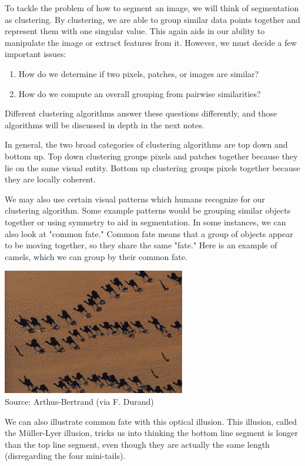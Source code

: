 \documentclass{article}
\begin{document}
To tackle the problem of how to segment an image, we will think of segmentation as clustering. By clustering, we are able to group similar data points together and represent them with one singular value. This again aids in our ability to manipulate the image or extract features from it. However, we must decide a few important issues:
\begin{enumerate}
\item How do we determine if two pixels, patches, or images are similar?
\item How do we compute an overall grouping from	
pairwise similarities?
\end{enumerate}
Different clustering algorithms answer these questions differently, and those algorithms will be discussed in depth in the next notes.

In general, the two broad categories of clustering algorithms are top down and bottom up. Top down clustering groups pixels and patches together because they lie on the same visual entity. Bottom up clustering groups pixels together because they are locally coherent.

We may also use certain visual patterns which humans recognize for our clustering algorithm. Some example patterns would be grouping similar objects together or using symmetry to aid in segmentation. In some instances, we can also look at "common fate." Common fate means that a group of objects appear to be moving together, so they share the same "fate." Here is an example of camels, which we can group by their common fate. 

\begin{center}
\includegraphics[width=8cm]{camels.png} \\
Source: Arthus-Bertrand (via F. Durand)
\end{center}

We can also illustrate common fate with this optical illusion. This illusion, called the Müller-Lyer illusion, tricks us into thinking the bottom line segment is longer than the top line segment, even though they are actually the same length (disregarding the four mini-tails). 
\end{document}
